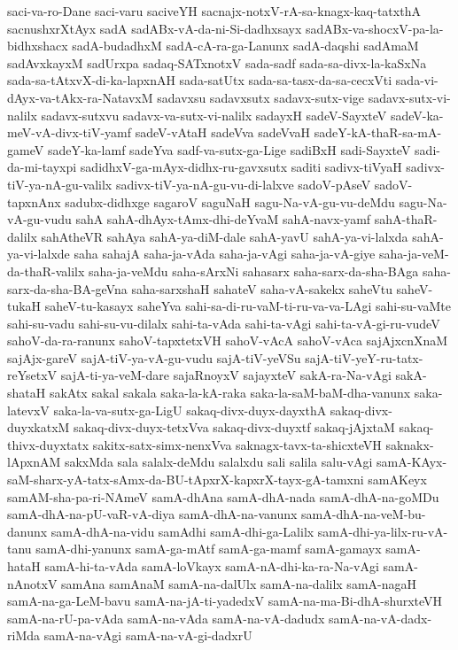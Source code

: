 {saci-va-ro-Dane
saci-varu
saciveYH
sacnajx-notxV-rA-sa-knagx-kaq-tatxthA
sacnushxrXtAyx
sadA
sadABx-vA-da-ni-Si-dadhxsayx
sadABx-va-shocxV-pa-la-bidhxshacx
sadA-budadhxM
sadA-cA-ra-ga-Lanunx
sadA-daqshi
sadAmaM
sadAvxkayxM
sadUrxpa
sadaq-SATxnotxV
sada-sadf
sada-sa-divx-la-kaSxNa
sada-sa-tAtxvX-di-ka-lapxnAH
sada-satUtx
sada-sa-tasx-da-sa-cecxVti
sada-vi-dAyx-va-tAkx-ra-NatavxM
sadavxsu
sadavxsutx
sadavx-sutx-vige
sadavx-sutx-vi-nalilx
sadavx-sutxvu
sadavx-va-sutx-vi-nalilx
sadayxH
sadeV-SayxteV
sadeV-ka-meV-vA-divx-tiV-yamf
sadeV-vAtaH
sadeVva
sadeVvaH
sadeY-kA-thaR-sa-mA-gameV
sadeY-ka-lamf
sadeYva
sadf-va-sutx-ga-Lige
sadiBxH
sadi-SayxteV
sadi-da-mi-tayxpi
sadidhxV-ga-mAyx-didhx-ru-gavxsutx
saditi
sadivx-tiVyaH
sadivx-tiV-ya-nA-gu-valilx
sadivx-tiV-ya-nA-gu-vu-di-lalxve
sadoV-pAseV
sadoV-tapxnAnx
sadubx-didhxge
sagaroV
saguNaH
sagu-Na-vA-gu-vu-deMdu
sagu-Na-vA-gu-vudu
sahA
sahA-dhAyx-tAmx-dhi-deYvaM
sahA-navx-yamf
sahA-thaR-dalilx
sahAtheVR
sahAya
sahA-ya-diM-dale
sahA-yavU
sahA-ya-vi-lalxda
sahA-ya-vi-lalxde
saha
sahajA
saha-ja-vAda
saha-ja-vAgi
saha-ja-vA-giye
saha-ja-veM-da-thaR-valilx
saha-ja-veMdu
saha-sArxNi
sahasarx
saha-sarx-da-sha-BAga
saha-sarx-da-sha-BA-geVna
saha-sarxshaH
sahateV
saha-vA-sakekx
saheVtu
saheV-tukaH
saheV-tu-kasayx
saheYva
sahi-sa-di-ru-vaM-ti-ru-va-va-LAgi
sahi-su-vaMte
sahi-su-vadu
sahi-su-vu-dilalx
sahi-ta-vAda
sahi-ta-vAgi
sahi-ta-vA-gi-ru-vudeV
sahoV-da-ra-ranunx
sahoV-tapxtetxVH
sahoV-vAcA
sahoV-vAca
sajAjxcnXnaM
sajAjx-gareV
sajA-tiV-ya-vA-gu-vudu
sajA-tiV-yeVSu
sajA-tiV-yeY-ru-tatx-reYsetxV
sajA-ti-ya-veM-dare
sajaRnoyxV
sajayxteV
sakA-ra-Na-vAgi
sakA-shataH
sakAtx
sakal
sakala
saka-la-kA-raka
saka-la-saM-baM-dha-vanunx
saka-latevxV
saka-la-va-sutx-ga-LigU
sakaq-divx-duyx-dayxthA
sakaq-divx-duyxkatxM
sakaq-divx-duyx-tetxVva
sakaq-divx-duyxtf
sakaq-jAjxtaM
sakaq-thivx-duyxtatx
sakitx-satx-simx-nenxVva
saknagx-tavx-ta-shicxteVH
saknakx-lApxnAM
sakxMda
sala
salalx-deMdu
salalxdu
sali
salila
salu-vAgi
samA-KAyx-saM-sharx-yA-tatx-sAmx-da-BU-tApxrX-kapxrX-tayx-gA-tamxni
samAKeyx
samAM-sha-pa-ri-NAmeV
samA-dhAna
samA-dhA-nada
samA-dhA-na-goMDu
samA-dhA-na-pU-vaR-vA-diya
samA-dhA-na-vanunx
samA-dhA-na-veM-bu-danunx
samA-dhA-na-vidu
samAdhi
samA-dhi-ga-Lalilx
samA-dhi-ya-lilx-ru-vA-tanu
samA-dhi-yanunx
samA-ga-mAtf
samA-ga-mamf
samA-gamayx
samA-hataH
samA-hi-ta-vAda
samA-loVkayx
samA-nA-dhi-ka-ra-Na-vAgi
samA-nAnotxV
samAna
samAnaM
samA-na-dalUlx
samA-na-dalilx
samA-nagaH
samA-na-ga-LeM-bavu
samA-na-jA-ti-yadedxV
samA-na-ma-Bi-dhA-shurxteVH
samA-na-rU-pa-vAda
samA-na-vAda
samA-na-vA-dadudx
samA-na-vA-dadx-riMda
samA-na-vAgi
samA-na-vA-gi-dadxrU
}

